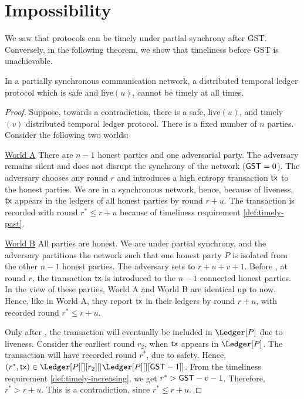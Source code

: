 \section{Impossibility}

We saw that protocols can be timely under partial synchrony after GST.
Conversely, in the following theorem, we show that timeliness before GST is unachievable.

\begin{theorem}
  In a partially synchronous communication network, a distributed temporal ledger protocol
  which is safe and live$(u)$, cannot be timely at all times.
\end{theorem}
\begin{proof}
  Suppose, towards a contradiction, there is a safe, live$(u)$, and timely$(v)$ distributed temporal ledger protocol.
  There is a fixed number of $n$ parties.
  Consider the following two worlds:

  \noindent
  \underline{World A}
  There are $n-1$ honest parties and one adversarial party. The adversary remains silent and
  does not disrupt the synchrony of the network ($\textsf{GST} = 0$).
  The adversary chooses any round $r$ and introduces a high entropy transaction $\textsf{tx}$ to the honest parties. We are in a
  synchronous network, hence, because of liveness, $\textsf{tx}$ appears in the ledgers of all honest parties
  by round $r + u$. The transaction is recorded with round $r^* \leq r + u$ because of
  timeliness requirement \ref{def:timely-past}.

  \noindent
  \underline{World B}
  All parties are honest. We are under partial synchrony, and the adversary partitions the network such that
  one honest party $P$ is isolated from the other $n-1$ honest parties.
  The adversary sets \gst to  $r + u + v + 1$.
  Before \gst, at round $r$, the transaction $\textsf{tx}$ is introduced to the $n-1$ connected
  honest parties. In the view of these parties,
  World A and World B are identical up to now. Hence, like in World A,
  they report $\textsf{tx}$ in their ledgers by round $r + u$, with recorded round $r^* \leq r + u$.

  Only after \gst, the transaction will eventually be included in $\Ledger[P]$ due to liveness.
  Consider the earliest round $r_2$, when $\textsf{tx}$ appears in $\Ledger[P]$.
  The transaction will have recorded round $r^*$, due to safety.
  Hence, $(r^*, \tx) \in \Ledger[P][][r_2][|\Ledger[P][][\gst - 1]]$.
  From the timeliness requirement \ref{def:timely-increasing}, we
  get $r^* > \textsf{GST} - v - 1$. Therefore, $r^* > r + u$.
  This is a contradiction, since $r^* \leq r + u$.

  \Qed
\end{proof}
